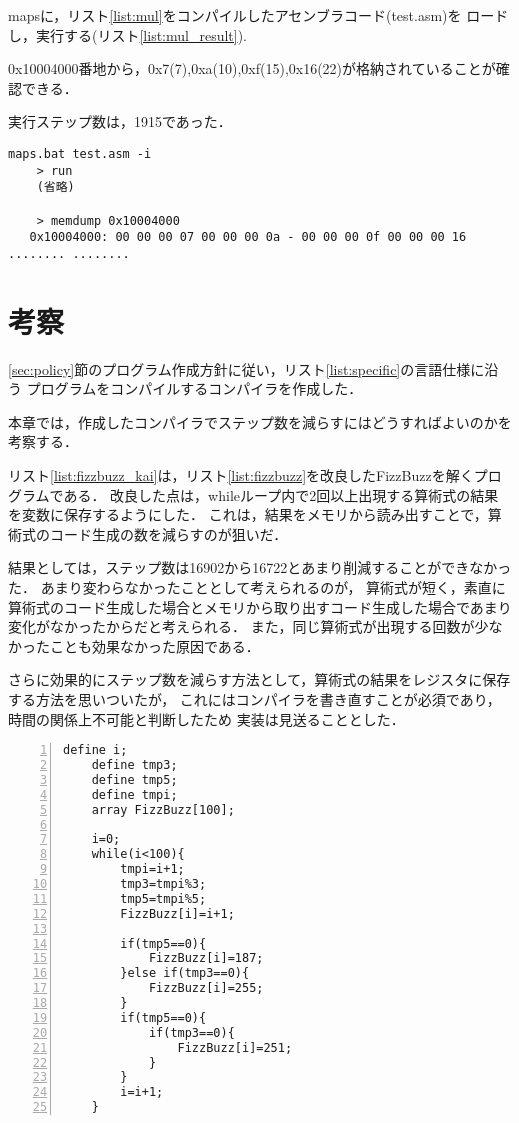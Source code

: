 \documentclass[11pt]{jarticle}
\begin{document}
mapsに，リスト\ref{list:mul}をコンパイルしたアセンブラコード(test.asm)を
ロードし，実行する(リスト\ref{list:mul_result}).

0x10004000番地から，0x7(7),0xa(10),0xf(15),0x16(22)が格納されていることが確認できる．

実行ステップ数は，1915であった．

\begin{lstlisting}[caption=2$\times$2行列の積の結果,label=list:mul_result]
    maps.bat test.asm -i
    > run
    (省略)

    > memdump 0x10004000 
   0x10004000: 00 00 00 07 00 00 00 0a - 00 00 00 0f 00 00 00 16  ........ ........
\end{lstlisting}

\section{考察}

\ref{sec:policy}節のプログラム作成方針に従い，リスト\ref{list:specific}の言語仕様に沿う
プログラムをコンパイルするコンパイラを作成した．

本章では，作成したコンパイラでステップ数を減らすにはどうすればよいのかを考察する．

リスト\ref{list:fizzbuzz_kai}は，リスト\ref{list:fizzbuzz}を改良したFizzBuzzを解くプログラムである．
改良した点は，whileループ内で2回以上出現する算術式の結果を変数に保存するようにした．
これは，結果をメモリから読み出すことで，算術式のコード生成の数を減らすのが狙いだ．

結果としては，ステップ数は16902から16722とあまり削減することができなかった．
あまり変わらなかったこととして考えられるのが，
算術式が短く，素直に算術式のコード生成した場合とメモリから取り出すコード生成した場合であまり変化がなかったからだと考えられる．
また，同じ算術式が出現する回数が少なかったことも効果なかった原因である．

さらに効果的にステップ数を減らす方法として，算術式の結果をレジスタに保存する方法を思いついたが，
これにはコンパイラを書き直すことが必須であり，時間の関係上不可能と判断したため
実装は見送ることとした．

\begin{lstlisting}[caption=FizzBuzz改良版,label=list:fizzbuzz_kai,numbers=left]
    define i;
    define tmp3;
    define tmp5;
    define tmpi;
    array FizzBuzz[100];

    i=0;
    while(i<100){
        tmpi=i+1;
        tmp3=tmpi%3;
        tmp5=tmpi%5;
        FizzBuzz[i]=i+1;

        if(tmp5==0){
            FizzBuzz[i]=187;
        }else if(tmp3==0){
            FizzBuzz[i]=255;
        }
        if(tmp5==0){
            if(tmp3==0){
                FizzBuzz[i]=251;
            }
        }
        i=i+1;
    }
\end{lstlisting}
\end{document}
